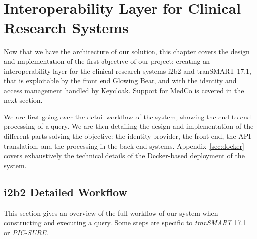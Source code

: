 
\chapter{Interoperability Layer for Clinical Research Systems}

Now that we have the architecture of our solution, this chapter covers the design and implementation of the first objective of our project: creating an interoperability layer for the clinical research systems i2b2 and tranSMART 17.1, that is exploitable by the front end Glowing Bear, and with the identity and access management handled by Keycloak.
Support for MedCo is covered in the next section.

We are first going over the detail workflow of the system, showing the end-to-end processing of a query.
We are then detailing the design and implementation of the different parts solving the objective: the identity provider, the front-end, the API translation, and the processing in the back end systems.
Appendix~\ref{sec:docker} covers exhaustively the technical details of the Docker-based deployment of the system.


\section{i2b2 Detailed Workflow}
\label{sec:interoplayer-wf}

This section gives an overview of the full workflow of our system when constructing and executing a query.
Some steps are specific to \textit{tranSMART} 17.1 or \textit{PIC-SURE}.

